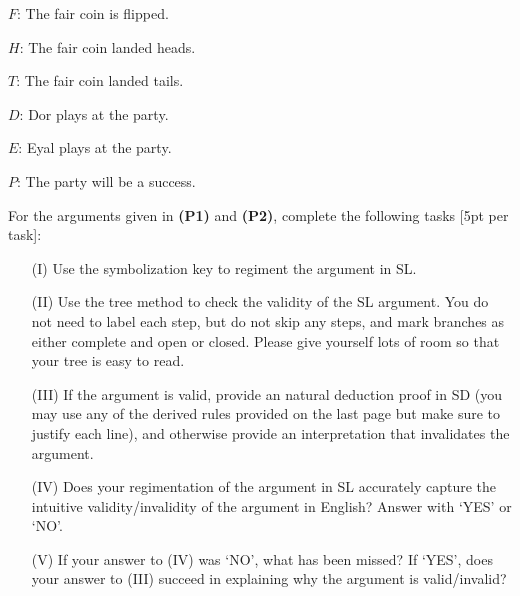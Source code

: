 \documentclass[12pt]{article}
\begin{document}
\begin{itemize}
  \begin{multicols}{2}
    \item[$F$:] The fair coin is flipped.
    \item[$H$:] The fair coin landed heads.
    \item[$T$:] The fair coin landed tails.
    
    \item[$D$:] Dor plays at the party.
    \item[$E$:] Eyal plays at the party.
    \item[$P$:] The party will be a success.
  \end{multicols}
\end{itemize}

\bigskip

\noindent
For the arguments given in \textbf{(P1)} and \textbf{(P2)}, complete the following tasks [5pt per task]:

\begin{itemize}
  \item[(I)] Use the symbolization key to regiment the argument in SL.
  \item[(II)] Use the tree method to check the validity of the SL argument.
    You do not need to label each step, but do not skip any steps, and mark branches as either complete and open or closed.
    Please give yourself lots of room so that your tree is easy to read.
  \item[(III)] If the argument is valid, provide an natural deduction proof in SD (you may use any of the derived rules provided on the last page but make sure to justify each line), and otherwise provide an interpretation that invalidates the argument.
  \item[(IV)] Does your regimentation of the argument in SL accurately capture the intuitive validity/invalidity of the argument in English? Answer with `YES' or `NO'.
  \item[(V)] If your answer to (IV) was `NO', what has been missed? 
    If `YES', does your answer to (III) succeed in explaining why the argument is valid/invalid?
\end{itemize}
\end{document}
